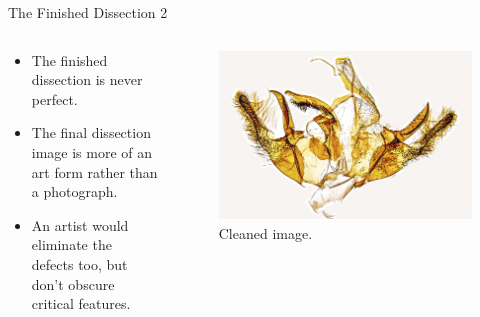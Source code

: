 \documentclass[
  ignorenonframetext,
]{beamer}
\providecommand{\tightlist}{%
  \setlength{\itemsep}{0pt}\setlength{\parskip}{0pt}}
\begin{document}
\begin{frame}{The Finished Dissection 2}
\protect\hypertarget{the-finished-dissection-2}{}
\begin{columns}[T]
\begin{column}{0.5\textwidth}
\begin{itemize}
\tightlist
\item
  The finished dissection is never perfect.
\item
  The final dissection image is more of an art form rather than a
  photograph.
\item
  An artist would eliminate the defects too, but don't obscure critical
  features.
\end{itemize}
\end{column}

\begin{column}{0.5\textwidth}
\begin{figure}
\centering
\includegraphics{./images/PJP20220218-001-cleaned.jpg}
\caption{Cleaned image.}
\end{figure}
\end{column}
\end{columns}
\end{frame}
\end{document}
